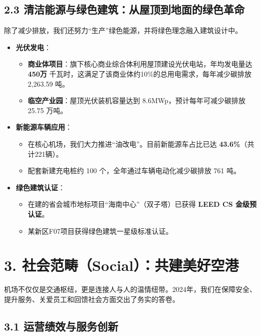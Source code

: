 \documentclass[a4paper,12pt]{article}
\begin{document}
\subsection{2.3 清洁能源与绿色建筑：从屋顶到地面的绿色革命}

除了减少排放，我们还努力“生产”绿色能源，并将绿色理念融入建筑设计中。

\begin{itemize}
    \item \textbf{光伏发电}：
    \begin{itemize}
        \item \textbf{商业体项目}：旗下核心商业综合体利用屋顶建设光伏电站，年均发电量达 \textbf{450万} 千瓦时，这满足了该商业体约10\%的总用电需求，每年减少碳排放 2,263.59 吨。
        \item \textbf{临空产业园}：屋顶光伏装机容量达到 8.6MWp，预计每年可减少碳排放 25.75 万吨。
    \end{itemize}
    
    \item \textbf{新能源车辆应用}：
    \begin{itemize}
        \item 在核心机场，我们大力推进“油改电”。目前新能源车占比已达 \textbf{43.6\%}（共计221辆）。
        \item 配套新建充电桩约 100 个，全年通过车辆电动化减少碳排放 761 吨。
    \end{itemize}

    \item \textbf{绿色建筑认证}：
    \begin{itemize}
        \item 在建的省会城市地标项目“海南中心”（双子塔）已获得 \textbf{LEED CS 金级预认证}。
        \item 某新区F07项目获得绿色建筑一星级标准认证。
    \end{itemize}
\end{itemize}

\section{3. 社会范畴（Social）：共建美好空港}

机场不仅仅是交通枢纽，更是连接人与人的温情纽带。2024年，我们在保障安全、提升服务、关爱员工和回馈社会方面交出了务实的答卷。

\subsection{3.1 运营绩效与服务创新}
\end{document}
